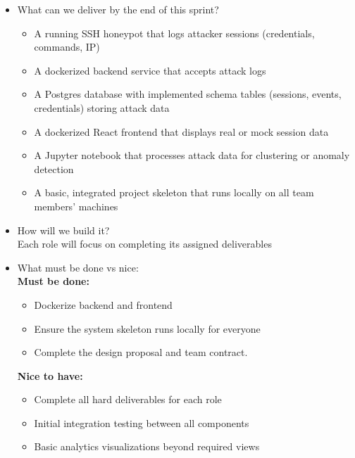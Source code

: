\documentclass{article}
\begin{document}
\begin{itemize}
    \item What can we deliver by the end of this sprint? 
    \begin{itemize}
        \item A running SSH honeypot that logs attacker sessions (credentials, commands, IP)
        \item A dockerized backend service that accepts attack logs
        \item A Postgres database with implemented schema tables (sessions, events, credentials) storing attack data
        \item A dockerized React frontend that displays real or mock session data
        \item A Jupyter notebook that processes attack data for clustering or anomaly detection
        \item A basic, integrated project skeleton that runs locally on all team members' machines
    \end{itemize}
    \item How will we build it? 
    \\Each role will focus on completing its assigned  deliverables

    \item What must be done vs nice:
    \\\textbf{Must be done:}
    \begin{itemize}
        \item Dockerize backend and frontend
        \item Ensure the system skeleton runs locally for everyone 
        \item Complete the design proposal and team contract.
    \end{itemize}
    \textbf{Nice to have:}
    \begin{itemize}
        \item Complete all hard deliverables for each role
        \item Initial integration testing between all components
        \item Basic analytics visualizations beyond required views
    \end{itemize}

\end{itemize}
\end{document}
